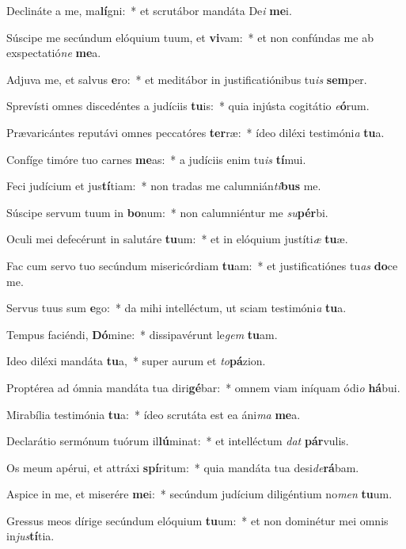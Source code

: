 \item Declináte a me, ma\textbf{lí}gni:~* et scrutábor mandáta De\textit{i} \textbf{me}i.
\item Súscipe me secúndum elóquium tuum, et \textbf{vi}vam:~* et non confúndas me ab exspectatió\textit{ne} \textbf{me}a.
\item Adjuva me, et salvus \textbf{e}ro:~* et meditábor in justificatiónibus tu\textit{is} \textbf{sem}per.
\item Sprevísti omnes discedéntes a judíciis \textbf{tu}is:~* quia injústa cogitátio \textit{e}\textbf{ó}rum.
\item Prævaricántes reputávi omnes peccatóres \textbf{ter}ræ:~* ídeo diléxi testimóni\textit{a} \textbf{tu}a.
\item Confíge timóre tuo carnes \textbf{me}as:~* a judíciis enim tu\textit{is} \textbf{tí}mui.
\item Feci judícium et jus\textbf{tí}tiam:~* non tradas me calumnián\textit{ti}\textbf{bus} me.
\item Súscipe servum tuum in \textbf{bo}num:~* non calumniéntur me \textit{su}\textbf{pér}bi.
\item Oculi mei defecérunt in salutáre \textbf{tu}um:~* et in elóquium justíti\textit{æ} \textbf{tu}æ.
\item Fac cum servo tuo secúndum misericórdiam \textbf{tu}am:~* et justificatiónes tu\textit{as} \textbf{do}ce me.
\item Servus tuus sum \textbf{e}go:~* da mihi intelléctum, ut sciam testimóni\textit{a} \textbf{tu}a.
\item Tempus faciéndi, \textbf{Dó}mine:~* dissipavérunt le\textit{gem} \textbf{tu}am.
\item Ideo diléxi mandáta \textbf{tu}a,~* super aurum et \textit{to}\textbf{pá}zion.
\item Proptérea ad ómnia mandáta tua diri\textbf{gé}bar:~* omnem viam iníquam ódi\textit{o} \textbf{há}bui.
\item Mirabília testimónia \textbf{tu}a:~* ídeo scrutáta est ea áni\textit{ma} \textbf{me}a.
\item Declarátio sermónum tuórum il\textbf{lú}minat:~* et intelléctum \textit{dat} \textbf{pár}vulis.
\item Os meum apérui, et attráxi \textbf{spí}ritum:~* quia mandáta tua desi\textit{de}\textbf{rá}bam.
\item Aspice in me, et miserére \textbf{me}i:~* secúndum judícium diligéntium no\textit{men} \textbf{tu}um.
\item Gressus meos dírige secúndum elóquium \textbf{tu}um:~* et non dominétur mei omnis in\textit{jus}\textbf{tí}tia.
